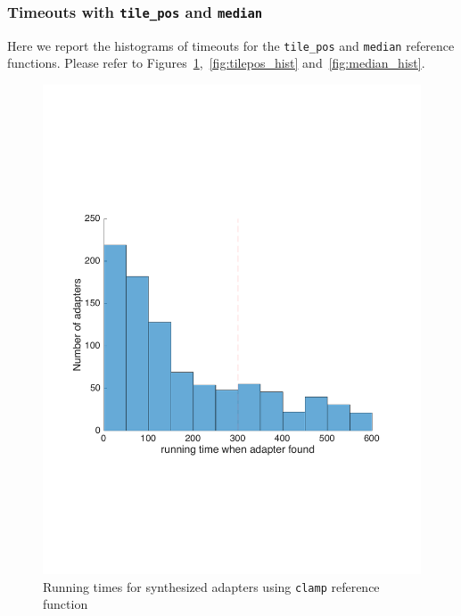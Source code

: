 \subsubsection{Timeouts with {\tt tile\_pos} and {\tt median}}
\label{sec:histograms}
Here we report the histograms of timeouts for the {\tt tile\_pos} and {\tt median} reference functions.
%
Please refer to Figures~\ref{fig:clamp_hist},~\ref{fig:tilepos_hist} and~\ref{fig:median_hist}.
%
\begin{figure}[ht]
    \centering
    \includegraphics[width=\widthfactor\textwidth]{chapters/adapter_synthesis/figures/clamp_hist}
    \caption{Running times for synthesized adapters using {\tt clamp} reference function}
    \label{fig:clamp_hist}
\end{figure}
